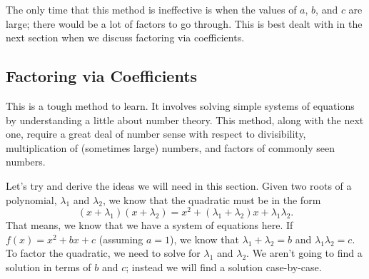 \documentclass[lang=en,11pt]{elegantbook}
\begin{document}
The only time that this method is ineffective is when the values of $a$, $b$, and $c$ are large; there would be a lot of factors to go through.  This is best dealt with in the next section when we discuss factoring via coefficients.
\subsection{Factoring via Coefficients}
\noindent This is a tough method to learn.  It involves solving simple systems of equations by understanding a little about number theory.  This method, along with the next one, require a great deal of number sense with respect to divisibility, multiplication of (sometimes large) numbers, and factors of commonly seen numbers.

Let's try and derive the ideas we will need in this section.  Given two roots of a polynomial, $\lambda_1$ and $\lambda_2$, we know that the quadratic must be in the form $$(x+\lambda_1)(x+\lambda_2)=x^2+\left(\lambda_1+\lambda_2\right)x+\lambda_1\lambda_2.$$  That means, we know that we have a system of equations here.  If $f(x)=x^2+bx+c$ (assuming $a=1$), we know that $\lambda_1+\lambda_2=b$ and $\lambda_1\lambda_2=c$.  To factor the quadratic, we need to solve for $\lambda_1$ and $\lambda_2$.  We aren't going to find a solution in terms of $b$ and $c$; instead we will find a solution case-by-case.
\end{document}
